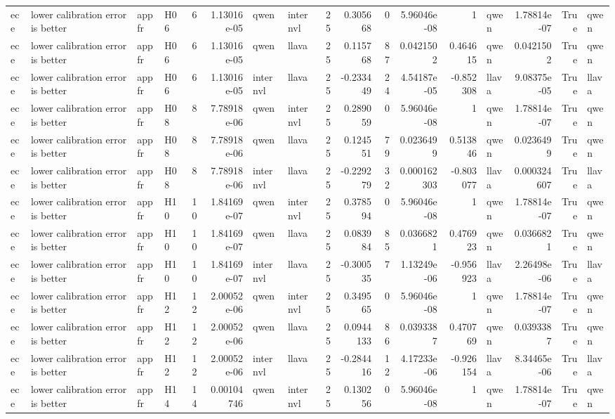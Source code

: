 \begin{longtable}{llllrrllrrrrrlrrl}
ece & lower calibration error is better & appfr & H06 & 6 & 1.13016e-05 & qwen & internvl & 25 & 0.305668 & 0 & 5.96046e-08 & 1 & qwen & 1.78814e-07 & True & qwen \\
ece & lower calibration error is better & appfr & H06 & 6 & 1.13016e-05 & qwen & llava & 25 & 0.115768 & 87 & 0.0421502 & 0.464615 & qwen & 0.0421502 & True & qwen \\
ece & lower calibration error is better & appfr & H06 & 6 & 1.13016e-05 & internvl & llava & 25 & -0.233449 & 24 & 4.54187e-05 & -0.852308 & llava & 9.08375e-05 & True & llava \\
ece & lower calibration error is better & appfr & H08 & 8 & 7.78918e-06 & qwen & internvl & 25 & 0.289059 & 0 & 5.96046e-08 & 1 & qwen & 1.78814e-07 & True & qwen \\
ece & lower calibration error is better & appfr & H08 & 8 & 7.78918e-06 & qwen & llava & 25 & 0.124551 & 79 & 0.0236499 & 0.513846 & qwen & 0.0236499 & True & qwen \\
ece & lower calibration error is better & appfr & H08 & 8 & 7.78918e-06 & internvl & llava & 25 & -0.229279 & 32 & 0.000162303 & -0.803077 & llava & 0.000324607 & True & llava \\
ece & lower calibration error is better & appfr & H10 & 10 & 1.84169e-07 & qwen & internvl & 25 & 0.378594 & 0 & 5.96046e-08 & 1 & qwen & 1.78814e-07 & True & qwen \\
ece & lower calibration error is better & appfr & H10 & 10 & 1.84169e-07 & qwen & llava & 25 & 0.083984 & 85 & 0.0366821 & 0.476923 & qwen & 0.0366821 & True & qwen \\
ece & lower calibration error is better & appfr & H10 & 10 & 1.84169e-07 & internvl & llava & 25 & -0.300535 & 7 & 1.13249e-06 & -0.956923 & llava & 2.26498e-06 & True & llava \\
ece & lower calibration error is better & appfr & H12 & 12 & 2.00052e-06 & qwen & internvl & 25 & 0.349565 & 0 & 5.96046e-08 & 1 & qwen & 1.78814e-07 & True & qwen \\
ece & lower calibration error is better & appfr & H12 & 12 & 2.00052e-06 & qwen & llava & 25 & 0.0944133 & 86 & 0.0393387 & 0.470769 & qwen & 0.0393387 & True & qwen \\
ece & lower calibration error is better & appfr & H12 & 12 & 2.00052e-06 & internvl & llava & 25 & -0.284416 & 12 & 4.17233e-06 & -0.926154 & llava & 8.34465e-06 & True & llava \\
ece & lower calibration error is better & appfr & H14 & 14 & 0.00104746 & qwen & internvl & 25 & 0.130256 & 0 & 5.96046e-08 & 1 & qwen & 1.78814e-07 & True & qwen \\

\end{longtable}
